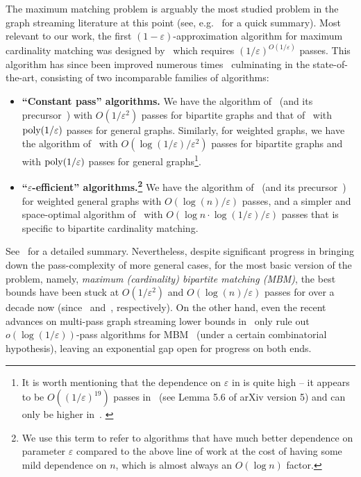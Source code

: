 \documentclass{article}
\newcommand{\eps}{\varepsilon}
\newcommand{\poly}{\mbox{\rm poly}}
\begin{document}
The maximum matching problem is arguably the most studied problem in the graph streaming literature at this point (see, e.g.~\cite{AssadiS23} for a quick summary). 
Most relevant to our work, the first $(1-\eps)$-approximation algorithm for maximum cardinality matching
was designed by~\cite{McGregor05} which requires $(1/\eps)^{O(1/\eps)}$ passes. 
This algorithm has since been improved numerous times~\cite{EggertKS09,AhnG11,AhnG11b,EggertKMS12,Kapralov13,AhnG15,BehnezhadDETY17,Tirodkar18,GamlathKMS19,AssadiLT21,FischerMU22,AssadiJJST22,HuangS23} culminating in the state-of-the-art, consisting of two incomparable families of algorithms:  

\begin{itemize}[itemsep=5pt]
	\item \textbf{``Constant pass'' algorithms.} We have the algorithm of~\cite{AssadiLT21} (and its precursor~\cite{AhnG11}) with $O(1/\eps^2)$ passes for {bipartite} graphs and that of~\cite{FischerMU22} with $\poly{(1/\eps)}$ passes for general graphs. Similarly, for weighted graphs, 
	we have the algorithm of~\cite{AhnG11} with $O(\log{(1/\eps)}/\eps^2)$ passes for bipartite graphs and~\cite{HuangS23} with $\poly{(1/\eps)}$ passes for general graphs\footnote{It is worth mentioning that the dependence on
	$\eps$ in \cite{FischerMU22, HuangS23} is quite high -- it appears to be $O((1/\eps)^{19})$ passes in~\cite{FischerMU22} (see Lemma 5.6 of arXiv version 5) and can only be higher in~\cite{HuangS23}. \label{footnote:eps}}. 

	\item \textbf{``$\eps$-efficient'' algorithms.\footnote{We use this term to refer to algorithms that have  much better dependence on parameter $\eps$ compared to the above line of work at the cost of having some mild dependence on $n$, which
	is almost always an $O(\log{n})$ factor.}} We have the algorithm of~\cite{AhnG15} (and its precursor~\cite{AhnG11b}) for weighted general graphs with $O(\log{\!(n)}/\eps)$ passes, and a simpler and space-optimal algorithm of~\cite{AssadiJJST22}
	with $O(\log{n}\cdot\log{(1/\eps)}/\eps)$ passes that is specific to bipartite cardinality matching.  
\end{itemize}

See~ for a detailed summary. Nevertheless, despite significant progress in bringing down the pass-complexity of more general cases, for the most basic version of the problem, namely, \emph{maximum (cardinality) bipartite matching (MBM)}, 
the best bounds have been stuck at $O(1/\eps^2)$  and $O(\log{\!(n)}/\eps)$ passes for over a decade now (since~\cite{AhnG11} and~\cite{AhnG11b}, respectively). On the other hand, 
even the recent advances on multi-pass graph streaming lower bounds in~\cite{AssadiR20,ChenKPSSY21,Assadi22,AssadiS23,KonradN24} only rule out $o(\log{(1/\eps)})$-pass algorithms for MBM~\cite{AssadiS23} (under a certain combinatorial hypothesis), leaving an exponential gap open for progress on both ends. 
\end{document}
